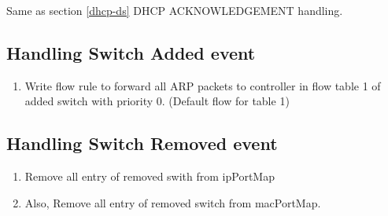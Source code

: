 \documentclass{article}
\begin{document}
Same as section \ref{dhcp-ds} DHCP ACKNOWLEDGEMENT handling.

\subsection{Handling Switch Added event}

\begin{enumerate}
	\item Write flow rule to forward all ARP packets to controller in flow table 1 of added switch with priority 0. (Default flow for table 1) 
\end{enumerate}

\subsection{Handling Switch Removed event}

\begin{enumerate}
	\item Remove all entry of removed swith from ipPortMap
	\item Also, Remove all entry of removed switch from macPortMap.
\end{enumerate}

\printbibliography
\end{document}
